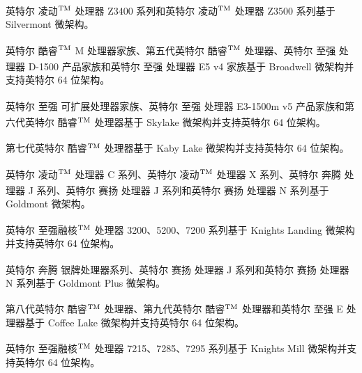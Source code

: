 \documentclass{article}
\begin{document}
英特尔\textsuperscript{\textregistered} 凌动$^{\rm{TM}}$ 处理器 Z3400 系列和英特尔\textsuperscript{\textregistered} 凌动$^{\rm{TM}}$ 处理器 Z3500 系列基于 Silvermont 微架构。

英特尔\textsuperscript{\textregistered} 酷睿$^{\rm{TM}}$ M 处理器家族、第五代英特尔\textsuperscript{\textregistered} 酷睿$^{\rm{TM}}$ 处理器、英特尔\textsuperscript{\textregistered} 至强\textsuperscript{\textregistered} 处理器 D-1500 产品家族和英特尔\textsuperscript{\textregistered} 至强\textsuperscript{\textregistered} 处理器 E5 v4 家族基于 Broadwell 微架构并支持英特尔 64 位架构。

英特尔\textsuperscript{\textregistered} 至强\textsuperscript{\textregistered} 可扩展处理器家族、英特尔\textsuperscript{\textregistered} 至强\textsuperscript{\textregistered} 处理器 E3-1500m v5 产品家族和第六代英特尔\textsuperscript{\textregistered} 酷睿$^{\rm{TM}}$ 处理器基于 Skylake 微架构并支持英特尔 64 位架构。

第七代英特尔\textsuperscript{\textregistered} 酷睿$^{\rm{TM}}$ 处理器基于 Kaby Lake 微架构并支持英特尔 64 位架构。

英特尔\textsuperscript{\textregistered} 凌动$^{\rm{TM}}$ 处理器 C 系列、英特尔\textsuperscript{\textregistered} 凌动$^{\rm{TM}}$ 处理器 X 系列、英特尔\textsuperscript{\textregistered} 奔腾\textsuperscript{\textregistered} 处理器 J 系列、英特尔\textsuperscript{\textregistered} 赛扬\textsuperscript{\textregistered} 处理器 J 系列和英特尔\textsuperscript{\textregistered} 赛扬\textsuperscript{\textregistered} 处理器 N 系列基于 Goldmont 微架构。

英特尔\textsuperscript{\textregistered} 至强融核$^{\rm{TM}}$ 处理器 3200、5200、7200 系列基于 Knights Landing 微架构并支持英特尔 64 位架构。

英特尔\textsuperscript{\textregistered} 奔腾\textsuperscript{\textregistered} 银牌处理器系列、英特尔\textsuperscript{\textregistered} 赛扬\textsuperscript{\textregistered} 处理器 J 系列和英特尔\textsuperscript{\textregistered} 赛扬\textsuperscript{\textregistered} 处理器 N 系列基于 Goldmont Plus 微架构。

第八代英特尔\textsuperscript{\textregistered} 酷睿$^{\rm{TM}}$ 处理器、第九代英特尔\textsuperscript{\textregistered} 酷睿$^{\rm{TM}}$ 处理器和英特尔\textsuperscript{\textregistered} 至强\textsuperscript{\textregistered} E 处理器基于 Coffee Lake 微架构并支持英特尔 64 位架构。

英特尔\textsuperscript{\textregistered} 至强融核$^{\rm{TM}}$ 处理器 7215、7285、7295 系列基于 Knights Mill 微架构并支持英特尔 64 位架构。
\end{document}
